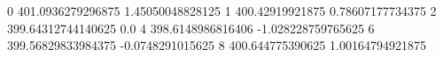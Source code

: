 0 401.0936279296875 1.45050048828125
1 400.42919921875 0.78607177734375
2 399.64312744140625 0.0
4 398.6148986816406 -1.028228759765625
6 399.56829833984375 -0.0748291015625
8 400.644775390625 1.00164794921875
